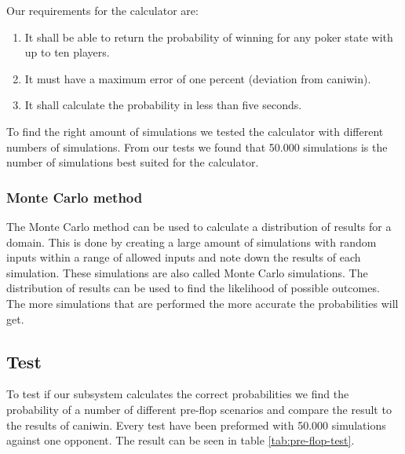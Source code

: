 Our requirements for the calculator are:
\begin{enumerate}
\item It shall be able to return the probability of winning for any poker state with up to ten players.
\item It must have a maximum error of one percent (deviation from caniwin\cite{caniwin}).
\item It shall calculate the probability in less than five seconds.
\end{enumerate}

To find the right amount of simulations we tested the calculator with different numbers of simulations. From our tests we found that 50.000 simulations is the number of simulations best suited for the calculator.

\subsubsection{Monte Carlo method}
The Monte Carlo method can be used to calculate a distribution of results for a domain. This is done by creating a large amount of simulations with random inputs within a range of allowed inputs and note down the results of each simulation. These simulations are also called Monte Carlo simulations. The distribution of results can be used to find the likelihood of possible outcomes. The more simulations that are performed the more accurate the probabilities will get.

\subsection{Test}
To test if our subsystem calculates the correct probabilities we find the probability of a number of different pre-flop scenarios and compare the result to the results of caniwin. Every test have been preformed with 50.000 simulations against one opponent. The result can be seen in table \ref{tab:pre-flop-test}.

